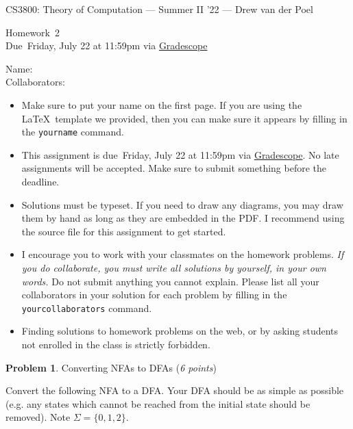 \documentclass[11pt]{article}
\newcommand{\yourname}{}
\newcommand{\yourcollaborators}{}
\theoremstyle{definition}
\newcommand{\instructor}{Drew van der Poel}
\newcommand{\hwnum}{2}
\newcommand{\hwdue}{Friday, July 22 at 11:59pm via \href{https://www.gradescope.com/courses/406943}{Gradescope}}
\theoremstyle{theorem}
\newtheorem{prob}{Problem}
\begin{document}
{\Large 
\begin{center}{CS3800: Theory of Computation} --- Summer II '22 --- \instructor \end{center}}
{\large
\vspace{10pt}
\noindent Homework~\hwnum \vspace{2pt}\\
Due~\hwdue}

\bigskip
{\large
\noindent Name: \yourname \vspace{2pt}\\ Collaborators: \yourcollaborators}

\vspace{15pt}
\begin{itemize}

\item Make sure to put your name on the first page.  If you are using the \LaTeX~template we provided, then you can make sure it appears by filling in the \texttt{yourname} command.

\item This assignment is due~\hwdue.  No late assignments will be accepted.  Make sure to submit something before the deadline.

\item Solutions must be typeset.  If you need to draw any diagrams, you may draw them by hand as long as they are embedded in the PDF.  I recommend using the source file for this assignment to get started.

\item I encourage you to work with your classmates on the homework problems. \emph{If you do collaborate, you must write all solutions by yourself, in your own words.}  Do not submit anything you cannot explain.  Please list all your collaborators in your solution for each problem by filling in the \texttt{yourcollaborators} command.

\item Finding solutions to homework problems on the web, or by asking students not enrolled in the class is strictly forbidden.

\end{itemize}





\newpage

\begin{prob} Converting NFAs to DFAs (\emph{6 points})\end{prob}


Convert the following NFA to a DFA. Your DFA should be as simple as possible (e.g. any states which cannot be reached from the initial state should be removed). Note $\Sigma = \{0,1,2\}$.
\end{document}
